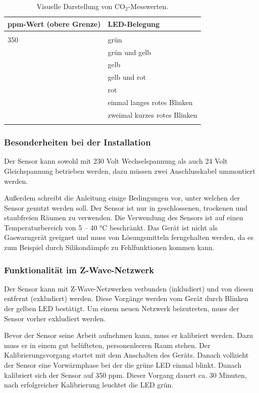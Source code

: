 \begin{longtabu} to 
	\hline
	\textbf{ppm-Wert (obere Grenze)}	& \textbf{LED-Belegung} \\
	\hline
	\endhead
	  \\ 
	\endfoot
	\endlastfoot
	350									& grün \\ 
										& grün und gelb \\
										& gelb \\
									& gelb und rot \\
									& rot \\
									& einmal langes rotes Blinken \\
									& zweimal kurzes rotes Blinken \\
	\hline
	\caption{Visuelle Darstellung von CO$_2$-Messwerten.}
\end{longtabu}

\subsubsection{Besonderheiten bei der Installation}
Der Sensor kann sowohl mit 230 Volt Wechselspannung als auch 24 Volt Gleichspannung betrieben werden, dazu müssen zwei Anschlusskabel ummontiert werden.

Außerdem schreibt die Anleitung einige Bedingungen vor, unter welchen der Sensor genutzt werden soll. Der Sensor ist nur in geschlossenen, trockenen und staubfreien Räumen zu verwenden. Die Verwendung des Sensors ist auf einen Temperaturbereich von 5 – 40 °C beschränkt. Das Gerät ist nicht als Gaswarngerät geeignet und muss von Lösungsmitteln ferngehalten werden, da es zum Beispiel durch Silikondämpfe zu Fehlfunktionen kommen kann. 

\subsubsection{Funktionalität im Z-Wave-Netzwerk}
Der Sensor kann mit Z-Wave-Netzwerken verbunden (inkludiert) und von diesen entfernt (exkludiert) werden. Diese Vorgänge werden vom Gerät durch Blinken der gelben LED bestätigt. Um einem neuen Netzwerk beizutreten, muss der Sensor vorher exkludiert werden.

Bevor der Sensor seine Arbeit aufnehmen kann, muss er kalibriert werden. Dazu muss er in einem gut belüfteten, personenleeren Raum stehen. Der Kalibrierungsvorgang startet mit dem Anschalten des Geräts. Danach vollzieht der Sensor eine Vorwärmphase bei der die grüne LED einmal blinkt. Danach kalibriert sich der Sensor auf 350 \gls{ppm}. Dieser Vorgang dauert ca. 30 Minuten, nach erfolgreicher Kalibrierung leuchtet die LED grün.

